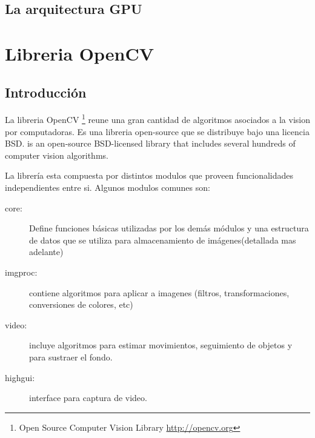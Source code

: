 \documentclass[a4paper,10pt]{report}
\begin{document}
\section{La arquitectura GPU}

\chapter{Libreria OpenCV}

\section{Introducción}
La libreria OpenCV \footnote{Open Source Computer Vision Library \url{http://opencv.org}} reune una gran cantidad de algoritmos asociados a la vision por computadoras. 
Es una libreria open-source que se distribuye bajo una licencia BSD.  is an open-source BSD-licensed library that includes several hundreds of computer vision algorithms. 

La librería esta compuesta por distintos modulos que proveen funcionalidades independientes entre si. Algunos modulos comunes son:
\begin{description}
 \item[core:] Define funciones básicas utilizadas por los demás módulos y una estructura de datos que se utiliza para almacenamiento de imágenes(detallada mas adelante)  
 \item[imgproc:] contiene algoritmos para aplicar a imagenes (filtros, transformaciones, conversiones de colores, etc)
 \item[video:] incluye algoritmos para estimar movimientos, seguimiento de objetos y para sustraer el fondo.
 \item[highgui:] interface para captura de video.
\end{description}

\end{document}
